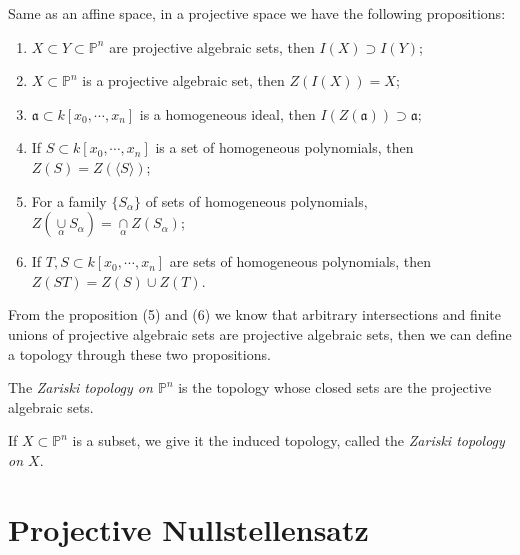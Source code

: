 \begin{proposition}
	Same as an affine space, in a projective space we have the following propositions:
	\begin{enumerate}
		\item $ X\subset Y\subset \mathbb{P}^n $ are projective algebraic sets, then
		      $ I(X)\supset I(Y) $;
		\item $ X\subset \mathbb{P}^n $ is a projective algebraic set, then $ Z(I(X))=X $;
		\item $ \mathfrak{a}\subset k[x_0,\cdots,x_n] $ is a homogeneous ideal, then $ I(Z(\mathfrak{a}))\supset \mathfrak{a} $;
		\item If $ S\subset k[x_0,\cdots,x_n] $ is a set of homogeneous polynomials, then $ Z(S)=Z(\langle S \rangle ) $;
		\item For a family $ \{ S_\alpha \} $ of sets of homogeneous polynomials, $ Z(\mathop{\cup}\limits_\alpha S_\alpha) = \mathop{\cap}\limits_\alpha Z(S_\alpha)$;
		\item If $ T,S\subset k[x_0,\cdots,x_n] $ are sets of homogeneous polynomials, then $ Z(ST)=Z(S)\cup Z(T) $.
	\end{enumerate}
\end{proposition}
\begin{remark}
	From the proposition (5) and (6) we know that arbitrary intersections and finite unions  of projective algebraic sets are projective algebraic sets, then we can define a topology through these two propositions.
\end{remark}
\begin{definition}
	The \textit{Zariski topology on $ \mathbb{P}^n $} is the topology whose closed sets are the projective algebraic sets.

	If $ X\subset \mathbb{P}^n $ is a subset, we give it the induced topology, called the \textit{Zariski topology on $ X $}.
\end{definition}

\section{Projective Nullstellensatz}

